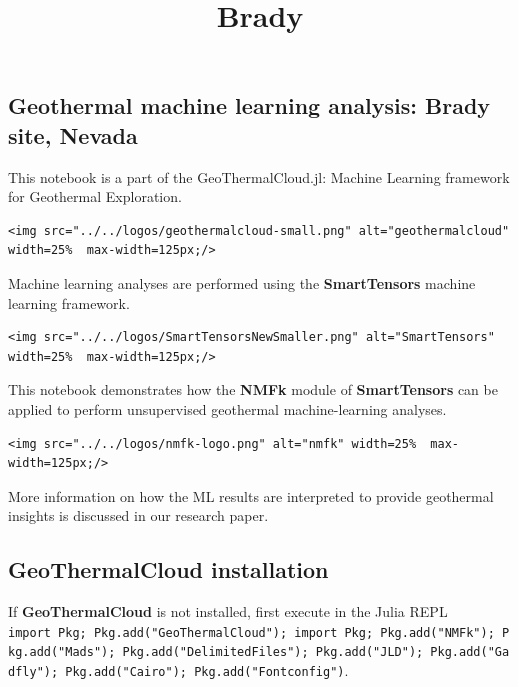\documentclass[11pt]{article}
\title{Brady}
\begin{document}
    \maketitle




    \hypertarget{geothermal-machine-learning-analysis-brady-site-nevada}{%
\subsection{Geothermal machine learning analysis: Brady site,
Nevada}\label{geothermal-machine-learning-analysis-brady-site-nevada}}

This notebook is a part of the GeoThermalCloud.jl: Machine Learning
framework for Geothermal Exploration.

\begin{verbatim}
<img src="../../logos/geothermalcloud-small.png" alt="geothermalcloud" width=25%  max-width=125px;/>
\end{verbatim}

Machine learning analyses are performed using the \textbf{SmartTensors}
machine learning framework.

\begin{verbatim}
<img src="../../logos/SmartTensorsNewSmaller.png" alt="SmartTensors" width=25%  max-width=125px;/>
\end{verbatim}

This notebook demonstrates how the \textbf{NMFk} module of
\textbf{SmartTensors} can be applied to perform unsupervised geothermal
machine-learning analyses.

\begin{verbatim}
<img src="../../logos/nmfk-logo.png" alt="nmfk" width=25%  max-width=125px;/>
\end{verbatim}

More information on how the ML results are interpreted to provide
geothermal insights is discussed in our research paper.

    \hypertarget{geothermalcloud-installation}{%
\subsection{GeoThermalCloud
installation}\label{geothermalcloud-installation}}

If \textbf{GeoThermalCloud} is not installed, first execute in the Julia
REPL
\texttt{import\ Pkg;\ Pkg.add("GeoThermalCloud");\ import\ Pkg;\ Pkg.add("NMFk");\ Pkg.add("Mads");\ Pkg.add("DelimitedFiles");\ Pkg.add("JLD");\ Pkg.add("Gadfly");\ Pkg.add("Cairo");\ Pkg.add("Fontconfig")}.
\end{document}
